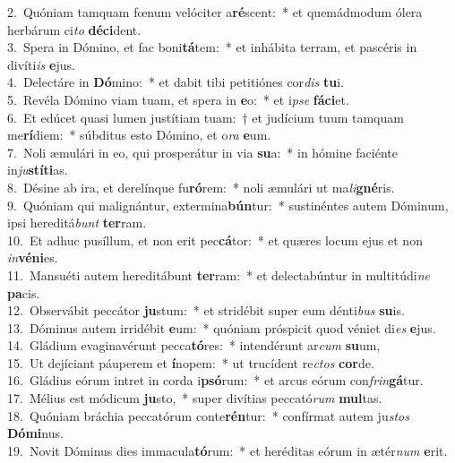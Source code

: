 {2.~}Quóniam tamquam fœnum velóciter a\textbf{ré}scent:~* et quemádmodum ólera herbárum ci\textit{to} \textbf{dé}\textbf{ci}dent.\\
{3.~}Spera in Dómino, et fac boni\textbf{tá}tem:~* et inhábita terram, et pascéris in divíti\textit{is} \textbf{e}jus.\\
{4.~}Delectáre in \textbf{Dó}mino:~* et dabit tibi petitiónes cor\textit{dis} \textbf{tu}i.\\
{5.~}Revéla Dómino viam tuam, et spera in \textbf{e}o:~* et i\textit{pse} \textbf{fá}\textbf{ci}et.\\
{6.~}Et edúcet quasi lumen justítiam tuam:~† et judícium tuum tamquam me\textbf{rí}diem:~* súbditus esto Dómino, et o\textit{ra} \textbf{e}um.\\
{7.~}Noli æmulári in eo, qui prosperátur in via \textbf{su}a:~* in hómine faciénte in\textit{ju}\textbf{stí}\textbf{ti}as.\\
{8.~}Désine ab ira, et derelínque fu\textbf{ró}rem:~* noli æmulári ut ma\textit{li}\textbf{gné}ris.\\
{9.~}Quóniam qui malignántur, extermina\textbf{bún}tur:~* sustinéntes autem Dóminum, ipsi hereditá\textit{bunt} \textbf{ter}ram.\\
{10.~}Et adhuc pusíllum, et non erit pec\textbf{cá}tor:~* et quæres locum ejus et non \textit{in}\textbf{vé}\textbf{ni}es.\\
{11.~}Mansuéti autem hereditábunt \textbf{ter}ram:~* et delectabúntur in multitúdi\textit{ne} \textbf{pa}cis.\\
{12.~}Observábit peccátor \textbf{ju}stum:~* et stridébit super eum dénti\textit{bus} \textbf{su}is.\\
{13.~}Dóminus autem irridébit \textbf{e}um:~* quóniam próspicit quod véniet di\textit{es} \textbf{e}jus.\\
{14.~}Gládium evaginavérunt pecca\textbf{tó}res:~* intendérunt ar\textit{cum} \textbf{su}um,\\
{15.~}Ut dejíciant páuperem et \textbf{í}nopem:~* ut trucídent re\textit{ctos} \textbf{cor}de.\\
{16.~}Gládius eórum intret in corda i\textbf{psó}rum:~* et arcus eórum con\textit{frin}\textbf{gá}tur.\\
{17.~}Mélius est módicum \textbf{ju}sto,~* super divítias peccató\textit{rum} \textbf{mul}tas.\\
{18.~}Quóniam bráchia peccatórum conte\textbf{rén}tur:~* confírmat autem ju\textit{stos} \textbf{Dó}\textbf{mi}nus.\\
{19.~}Novit Dóminus dies immacula\textbf{tó}rum:~* et heréditas eórum in ætér\textit{num} \textbf{e}rit.\\
